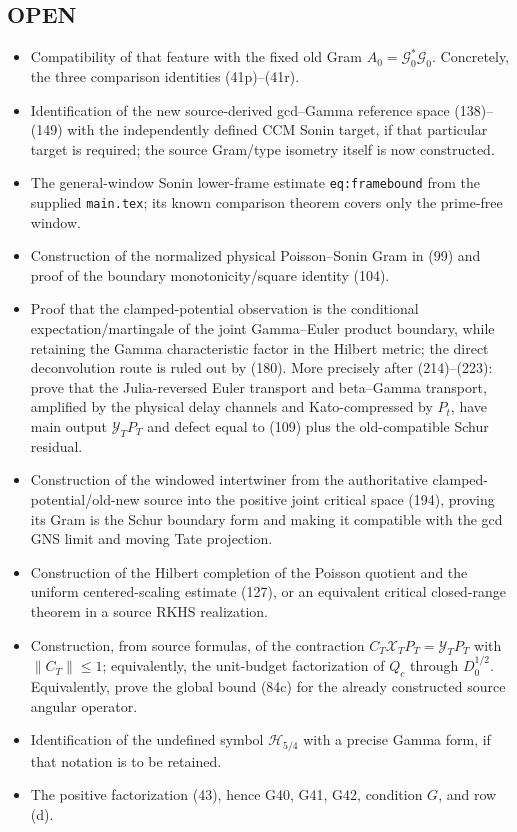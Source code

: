 \documentclass[11pt]{article}
\begin{document}
\subsection*{OPEN}
\begin{itemize}
\item Compatibility of that feature with the fixed old Gram
      $A_0=\mathcal G_0^*\mathcal G_0$.
      Concretely, the three comparison identities (41p)--(41r).
\item Identification of the new source-derived gcd--Gamma reference space
      (138)--(149) with the independently defined CCM Sonin target, if that
      particular target is required; the source Gram/type isometry itself is
      now constructed.
\item The general-window Sonin lower-frame estimate
      \texttt{eq:framebound} from the supplied \texttt{main.tex}; its known
      comparison theorem covers only the prime-free window.
\item Construction of the normalized physical Poisson--Sonin Gram in (99)
      and proof of the boundary monotonicity/square identity (104).
\item Proof that the clamped-potential observation is the conditional
      expectation/martingale of the joint Gamma--Euler product boundary,
      while retaining the Gamma characteristic factor in the Hilbert metric;
      the direct deconvolution route is ruled out by (180).
      More precisely after (214)--(223): prove that the Julia-reversed Euler
      transport and beta--Gamma transport, amplified by the physical delay
      channels and Kato-compressed by $P_t$, have main output
      $\mathcal Y_TP_T$ and defect equal to (109) plus the old-compatible
      Schur residual.
\item Construction of the windowed intertwiner from the authoritative
      clamped-potential/old-new source into the positive joint critical space
      (194), proving its Gram is the Schur boundary form and making it
      compatible with the gcd GNS limit and moving Tate projection.
\item Construction of the Hilbert completion of the Poisson quotient and the
      uniform centered-scaling estimate (127), or an equivalent critical
      closed-range theorem in a source RKHS realization.
\item Construction, from source formulas, of the contraction
      $C_T\mathcal X_TP_T=\mathcal Y_TP_T$ with $\|C_T\|\le1$; equivalently,
      the unit-budget factorization of $Q_c$ through $D_0^{1/2}$.
      Equivalently, prove the global bound (84c) for the already constructed
      source angular operator.
\item Identification of the undefined symbol $\mathcal H_{5/4}$ with a
      precise Gamma form, if that notation is to be retained.
\item The positive factorization (43), hence G40, G41, G42, condition $G$, and
      row (d).
\end{itemize}
\end{document}

